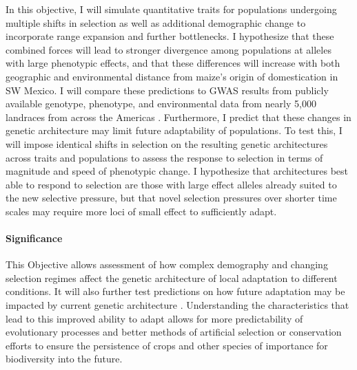In this objective, I will simulate quantitative traits for populations undergoing multiple shifts in selection as well as additional demographic change to incorporate range expansion and further bottlenecks. I hypothesize that these combined forces will lead to stronger divergence among populations at alleles with large phenotypic effects, and that these differences will increase with both geographic and environmental distance from maize's origin of domestication in SW Mexico. I will compare these predictions to GWAS results from publicly available genotype, phenotype, and environmental data from nearly 5,000 landraces from across the Americas \citep{Hearne2015}. Furthermore, I predict that these changes in genetic architecture may limit future adaptability of populations. To test this, I will impose identical shifts in selection on the resulting genetic architectures across traits and populations to assess the response to selection in terms of magnitude and speed of phenotypic change. I hypothesize that architectures best able to respond to selection are those with large effect alleles already suited to the new selective pressure, but that novel selection pressures over shorter time scales may require more loci of small effect to sufficiently adapt.

\vspace{-2ex}
\paragraph{Significance}
This Objective allows assessment of how complex demography and changing selection regimes affect the genetic architecture of local adaptation to different conditions. It will also further test predictions on how future adaptation may be impacted by current genetic architecture \citep{Yeaman:2015cc}. Understanding the characteristics that lead to this improved ability to adapt allows for more predictability of evolutionary processes and better methods of artificial selection or conservation efforts to ensure the persistence of crops and other species of importance for biodiversity into the future.
\vspace{-3ex}


